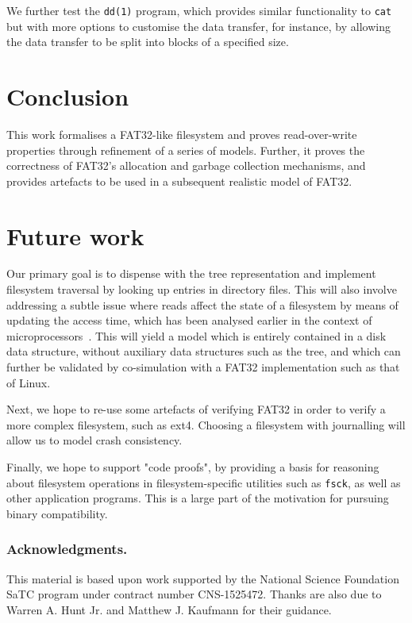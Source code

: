 \documentclass[submission,copyright,creativecommons]{eptcs}
\begin{document}
We further test the \texttt{dd(1)} program, which provides similar
functionality to \texttt{cat} but with more options to customise the
data transfer, for instance, by allowing the data transfer to be split
into blocks of a specified size.

\section{Conclusion}

This work formalises a FAT32-like filesystem and proves
read-over-write properties through refinement of a series of
models. Further, it proves the correctness of FAT32's allocation and
garbage collection mechanisms, and provides artefacts to be used in a
subsequent realistic model of FAT32.

\section{Future work}

Our primary goal is to dispense with the tree representation and
implement filesystem traversal by looking up entries in directory
files. This will also involve addressing a subtle issue where reads
affect the state of a filesystem by means of updating the access time,
which has been analysed earlier in the context of
microprocessors~\cite{goel2017engineering}. This will yield a model
which is entirely contained in a disk data structure, without
auxiliary data structures such as the tree, and which can
further be validated by co-simulation with a FAT32 implementation such
as that of Linux.

Next, we hope to re-use some artefacts of verifying FAT32 in order to
verify a more complex filesystem, such as ext4. Choosing a filesystem
with journalling will allow us to model crash consistency.

Finally, we hope to support "code proofs", by providing a basis for
reasoning about filesystem operations in filesystem-specific utilities
such as \texttt{fsck}, as well as other application programs. This is
a large part of the motivation for pursuing binary compatibility.

\subsubsection*{Acknowledgments.} This material is based upon work
supported by the National Science Foundation SaTC program under
contract number CNS-1525472. Thanks are also due to Warren A. Hunt
Jr. and Matthew J. Kaufmann for their guidance.
\end{document}
